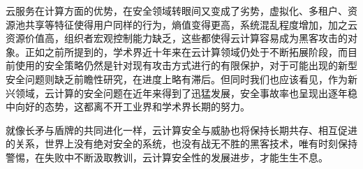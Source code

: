 \documentclass[a4paper, 12pt, conference]{ieeeconf}      %
\begin{document}
云服务在计算方面的优势，在安全领域转眼间又变成了劣势，虚拟化、多租户、资源池共享等特征使得用户同样的行为，熵值变得更高，系统混乱程度增加，加之云资源价值高，组织者宏观控制能力缺乏，这些都使得云计算容易成为黑客攻击的对象。正如之前所提到的，学术界近十年来在云计算领域仍处于不断拓展阶段，而目前使用的安全策略仍然是针对现有攻击方式进行的有限保护，对于可能出现的新型安全问题则缺乏前瞻性研究，在进度上略有滞后。但同时我们也应该看见，作为新兴领域，云计算的安全问题在近年来得到了迅猛发展，安全事故率也呈现出逐年稳中向好的态势，这都离不开工业界和学术界长期的努力。

就像长矛与盾牌的共同进化一样，云计算安全与威胁也将保持长期共存、相互促进的关系，世界上没有绝对安全的系统，也没有战无不胜的黑客技术，唯有时刻保持警惕，在失败中不断汲取教训，云计算安全性的发展进步，才能生生不息。




 


\end{document}
